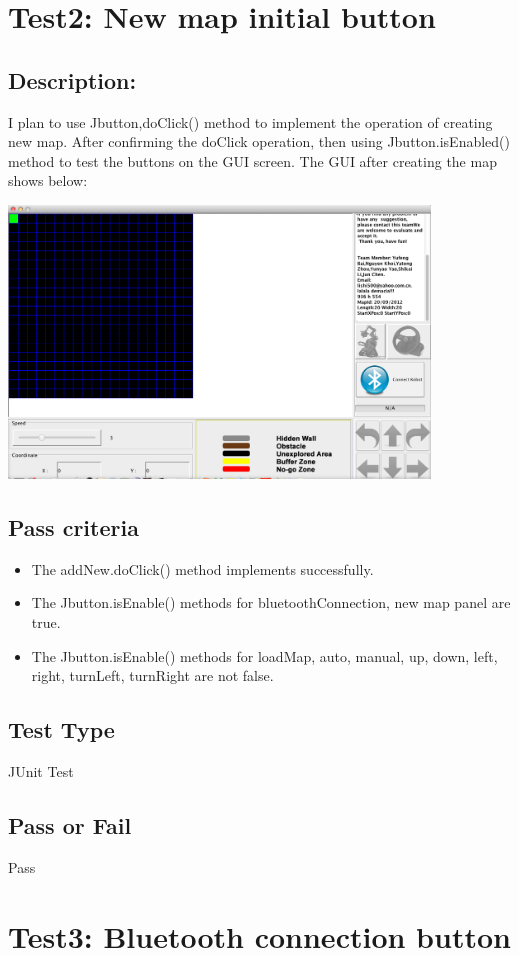 \documentclass[11pt, a4paper]{report}
\begin{document}
\section{Test2: New map initial button}
\subsection{Description:}
I plan to use Jbutton,doClick() method to implement the operation of creating new map. After confirming the doClick operation, then using Jbutton.isEnabled() method to test the buttons on the GUI screen. The GUI after creating the map shows below:
  \begin{center}
 \includegraphics[width=11.20cm]{newmapinitialbutton}
\end{center}
\subsection{Pass criteria}
\begin{itemize}
\item The addNew.doClick() method implements successfully.
\item The Jbutton.isEnable() methods for bluetoothConnection, new map panel are true.
\item The Jbutton.isEnable() methods for loadMap, auto, manual, up, down, left, right, turnLeft, turnRight are not false. 
\end{itemize}
\subsection{Test Type}
JUnit Test
\subsection{Pass or Fail}
Pass
\section{Test3: Bluetooth connection button}
\end{document}
